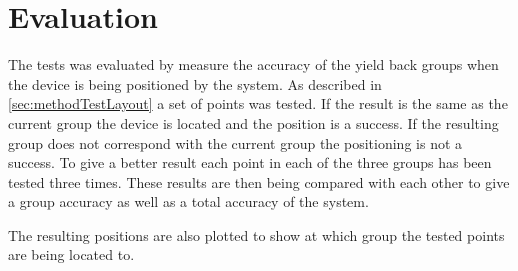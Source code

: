 \section{Evaluation}\label{sec:methodEvaluation}
The tests was evaluated by measure the accuracy of the yield back groups when the device is being positioned by the system.
As described in \cref{sec:methodTestLayout} a set of points was tested.
If the result is the same as the current group the device is located and the position is a success.
If the resulting group does not correspond with the current group the positioning is not a success.
To give a better result each point in each of the three groups has been tested three times.
These results are then being compared with each other to give a group accuracy as well as a total accuracy of the system.

\bigskip

The resulting positions are also plotted to show at which group the tested points are being located to.
